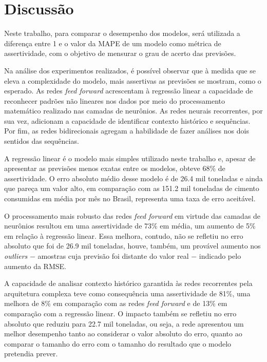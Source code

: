 
\chapter{Discussão}
\label{chap:discussao}

Neste trabalho, para comparar o desempenho dos modelos, 
 será utilizada a diferença entre 1 e o valor da MAPE de um 
modelo como métrica de assertividade, com o objetivo de mensurar o grau 
de acerto das previsões.

Na análise dos experimentos realizados, é possível observar que à medida que 
se eleva a complexidade do modelo, mais assertivas as previsões se mostram,
como o esperado. As redes \textit{feed forward} acrescentam à regressão linear
a capacidade de reconhecer padrões não lineares nos dados por meio do 
processamento matemático realizado nas camadas de neurônios. As redes neurais 
recorrentes, por sua vez, adicionam a capacidade de identificar contexto 
histórico e sequências. Por fim, as redes bidirecionais agregam a habilidade 
de fazer análises nos dois sentidos das sequências.

A regressão linear é o modelo mais simples utilizado neste trabalho e, apesar
de apresentar as previsões menos exatas entre os modelos, obteve 68\% de 
assertividade. O erro absoluto médio desse modelo é de 26.4 mil toneladas
e ainda que pareça um valor alto, em comparação com as 151.2 mil toneladas de cimento
consumidas em média por mês no Brasil, representa uma taxa de erro aceitável.

O processamento mais robusto das redes \textit{feed forward} em virtude das 
camadas de neurônios resultou em uma assertividade de 73\% em média, um aumento 
de 5\% em relação à regressão linear. Essa melhora, contudo, não se refletiu 
no erro absoluto que foi de 26.9 mil toneladas, houve, também, um provável
aumento nos \textit{outliers} $-$ amostras cuja previsão foi distante do valor 
real $-$ indicado pelo aumento da RMSE.

A capacidade de analisar contexto histórico garantida às redes recorrentes pela 
arquitetura complexa teve como consequência uma assertividade de 81\%, uma melhora 
de 8\% em comparação com as redes \textit{feed forward} e de 13\% em comparação 
com a regressão linear. O impacto também se refletiu no erro absoluto que 
reduziu para 22.7 mil toneladas, ou seja, a rede apresentou um melhor desempenho 
tanto ao considerar o valor absoluto do erro, quanto ao comparar o tamanho do 
erro com o tamanho do resultado que o modelo pretendia prever.


